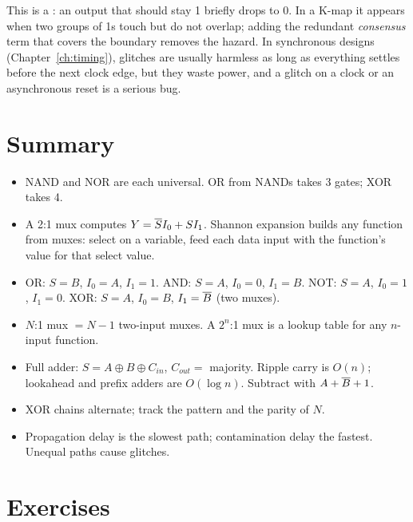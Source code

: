 This is a : an output that should stay 1 briefly drops to 0. In a K-map it appears when two groups of 1s touch but do not overlap; adding the redundant \emph{consensus} term that covers the boundary removes the hazard. In synchronous designs (Chapter~\ref{ch:timing}), glitches are usually harmless as long as everything settles before the next clock edge, but they waste power, and a glitch on a clock or an asynchronous reset is a serious bug.

\section{Summary}

\begin{itemize}
  \item NAND and NOR are each universal. OR from NANDs takes 3 gates; XOR takes 4.
  \item A 2:1 mux computes $Y = \overline{S}I_0 + SI_1$. Shannon expansion builds any function from muxes: select on a variable, feed each data input with the function's value for that select value.
  \item OR: $S = B$, $I_0 = A$, $I_1 = 1$. AND: $S = A$, $I_0 = 0$, $I_1 = B$. NOT: $S = A$, $I_0 = 1$, $I_1 = 0$. XOR: $S = A$, $I_0 = B$, $I_1 = \overline{B}$ (two muxes).
  \item $N$:1 mux $= N - 1$ two-input muxes. A $2^n$:1 mux is a lookup table for any $n$-input function.
  \item Full adder: $S = A\oplus B\oplus C_{in}$, $C_{out} = $ majority. Ripple carry is $O(n)$; lookahead and prefix adders are $O(\log n)$. Subtract with $A + \overline{B} + 1$.
  \item XOR chains alternate; track the pattern and the parity of $N$.
  \item Propagation delay is the slowest path; contamination delay the fastest. Unequal paths cause glitches.
\end{itemize}

\section{Exercises}

